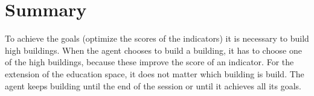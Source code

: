 \documentclass{article}
\begin{document}
\section{Summary}
To achieve the goals (optimize the scores of the indicators) it is necessary to build high  buildings. When the agent chooses to build a building, it has to choose one of the high buildings, because these improve the score of an indicator. For the extension of the education space, it does not matter which building is build. The agent keeps building until the end of the session or until it achieves all its goals. 
\end{document}
